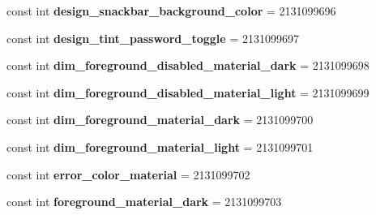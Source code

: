\begin{DoxyCompactItemize}
\mbox{\label{classst_delivery_1_1_resource_1_1_color_ae79d2f84953b2eede6bc9a3d77ce2d97}} 
const int {\bfseries design\+\_\+snackbar\+\_\+background\+\_\+color} = 2131099696
\item 
\mbox{\label{classst_delivery_1_1_resource_1_1_color_ab8621ffc22d70803aed741d74c3270c2}} 
const int {\bfseries design\+\_\+tint\+\_\+password\+\_\+toggle} = 2131099697
\item 
\mbox{\label{classst_delivery_1_1_resource_1_1_color_a1fcd5c780fed272cc8767e1d3300acfb}} 
const int {\bfseries dim\+\_\+foreground\+\_\+disabled\+\_\+material\+\_\+dark} = 2131099698
\item 
\mbox{\label{classst_delivery_1_1_resource_1_1_color_a7ed16397b2d58955fa83249415ef4ca0}} 
const int {\bfseries dim\+\_\+foreground\+\_\+disabled\+\_\+material\+\_\+light} = 2131099699
\item 
\mbox{\label{classst_delivery_1_1_resource_1_1_color_aa2973ab036c9c0858011075695f47cd2}} 
const int {\bfseries dim\+\_\+foreground\+\_\+material\+\_\+dark} = 2131099700
\item 
\mbox{\label{classst_delivery_1_1_resource_1_1_color_a12ff9e20d1670c0e620eb253aeb09f3a}} 
const int {\bfseries dim\+\_\+foreground\+\_\+material\+\_\+light} = 2131099701
\item 
\mbox{\label{classst_delivery_1_1_resource_1_1_color_abedc0ad7d0577e0ea81e69b42a8f4416}} 
const int {\bfseries error\+\_\+color\+\_\+material} = 2131099702
\item 
\mbox{\label{classst_delivery_1_1_resource_1_1_color_a378485e89b5c61763d685213e291291d}} 
const int {\bfseries foreground\+\_\+material\+\_\+dark} = 2131099703
\item 
\mbox{\label{classst_delivery_1_1_resource_1_1_color_a1d72f20dd794c23e9d062b8549d67fa8}} 

\end{DoxyCompactItemize}
